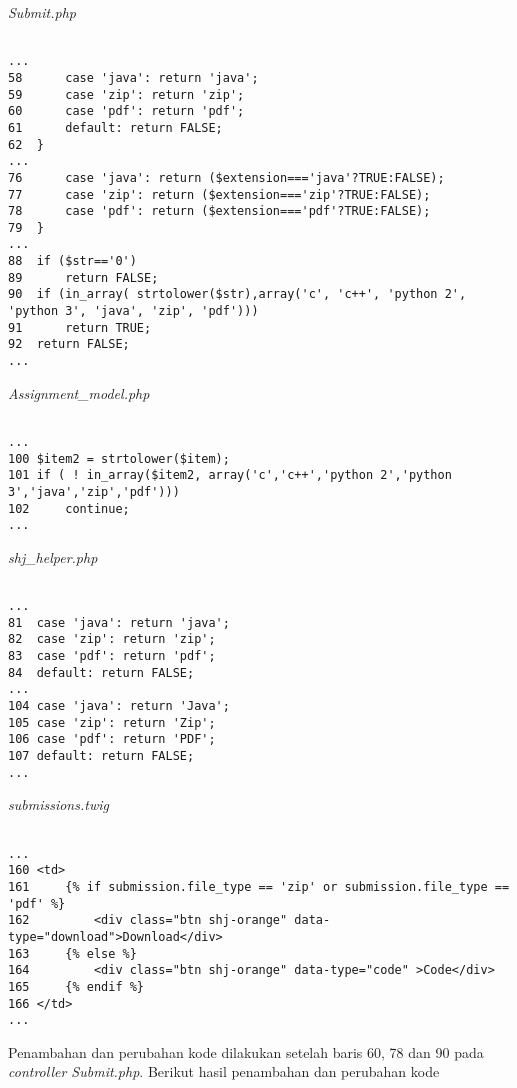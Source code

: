 \textit{Submit.php}
\begin{lstlisting}[basicstyle=\ttfamily, frame=single,
columns=fullflexible, keepspaces=true, breaklines=true]

...
58		case 'java': return 'java';
59		case 'zip': return 'zip';
60		case 'pdf': return 'pdf';
61		default: return FALSE;
62	}
...
76		case 'java': return ($extension==='java'?TRUE:FALSE);
77		case 'zip': return ($extension==='zip'?TRUE:FALSE);
78		case 'pdf': return ($extension==='pdf'?TRUE:FALSE);
79	}
...
88	if ($str=='0')
89		return FALSE;
90	if (in_array( strtolower($str),array('c', 'c++', 'python 2', 'python 3', 'java', 'zip', 'pdf')))
91		return TRUE;
92	return FALSE;
...

\end{lstlisting}

\textit{Assignment\_model.php}
\begin{lstlisting}[basicstyle=\ttfamily, frame=single,
columns=fullflexible, keepspaces=true, breaklines=true]

...
100	$item2 = strtolower($item);
101	if ( ! in_array($item2, array('c','c++','python 2','python 3','java','zip','pdf')))
102		continue;
...

\end{lstlisting}

\textit{shj\_helper.php}
\begin{lstlisting}[basicstyle=\ttfamily, frame=single,
columns=fullflexible, keepspaces=true, breaklines=true]

...
81	case 'java': return 'java';
82	case 'zip': return 'zip';
83	case 'pdf': return 'pdf';
84	default: return FALSE;
...
104	case 'java': return 'Java';
105	case 'zip': return 'Zip';
106	case 'pdf': return 'PDF';
107	default: return FALSE;
...

\end{lstlisting}

\textit{submissions.twig}
\begin{lstlisting}[basicstyle=\ttfamily, frame=single,
columns=fullflexible, keepspaces=true, breaklines=true]

...
160	<td>
161		{% if submission.file_type == 'zip' or submission.file_type == 'pdf' %}
162			<div class="btn shj-orange" data-type="download">Download</div>
163		{% else %}
164			<div class="btn shj-orange" data-type="code" >Code</div>
165		{% endif %}
166	</td>
...

\end{lstlisting}

Penambahan dan perubahan kode dilakukan setelah baris 60, 78 dan 90 pada \textit{controller Submit.php}. Berikut hasil penambahan dan perubahan kode 

